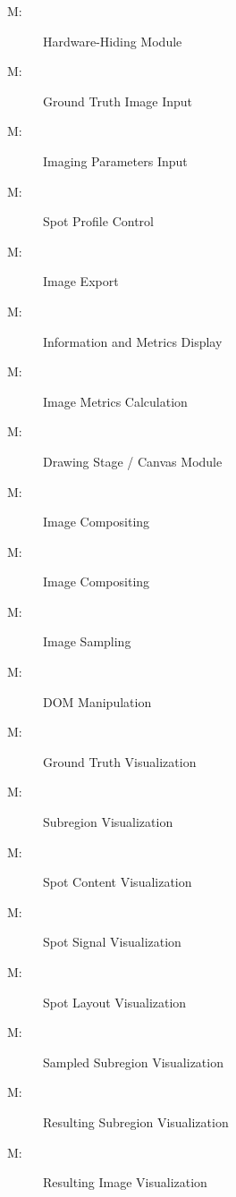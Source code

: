 \documentclass[12pt, titlepage]{article}
\newcounter{mnum}
\newcommand{\mthemnum}{M\themnum}
\begin{document}
\begin{description}
\item [ \mthemnum \label{M_HdwHide}:] Hardware-Hiding Module
\item [ \mthemnum \label{M_imgGTInput}:] Ground Truth Image Input
\item [ \mthemnum \label{M_params}:] Imaging Parameters Input
\item [ \mthemnum \label{M_vizSpotProfile}:] Spot Profile Control
\item [ \mthemnum \label{M_export}:] Image Export
\item [ \mthemnum \label{M_infoDisp}:] Information and Metrics Display
\item [ \mthemnum \label{M_metric}:] Image Metrics Calculation
\item [ \mthemnum \label{M_drawStage}:] Drawing Stage / Canvas Module
\item [ \mthemnum \label{M_compositing}:] Image Compositing
\item [ \mthemnum \label{M_rendering}:] Image Compositing
\item [ \mthemnum \label{M_sampling}:] Image Sampling
\item [ \mthemnum \label{M_DOM}:] DOM Manipulation
\item [ \mthemnum \label{M_vizGT}:] Ground Truth Visualization
\item [ \mthemnum \label{M_vizSubregion}:] Subregion Visualization
\item [ \mthemnum \label{M_vizSpotContent}:] Spot Content Visualization
\item [ \mthemnum \label{M_vizSpotSignal}:] Spot Signal Visualization
\item [ \mthemnum \label{M_vizSpotLayout}:] Spot Layout Visualization
\item [ \mthemnum \label{M_vizSampledSub}:] Sampled Subregion Visualization
\item [ \mthemnum \label{M_vizResultSub}:] Resulting Subregion Visualization
\item [ \mthemnum \label{M_vizResultImg}:] Resulting Image Visualization
\end{description}
\end{document}
